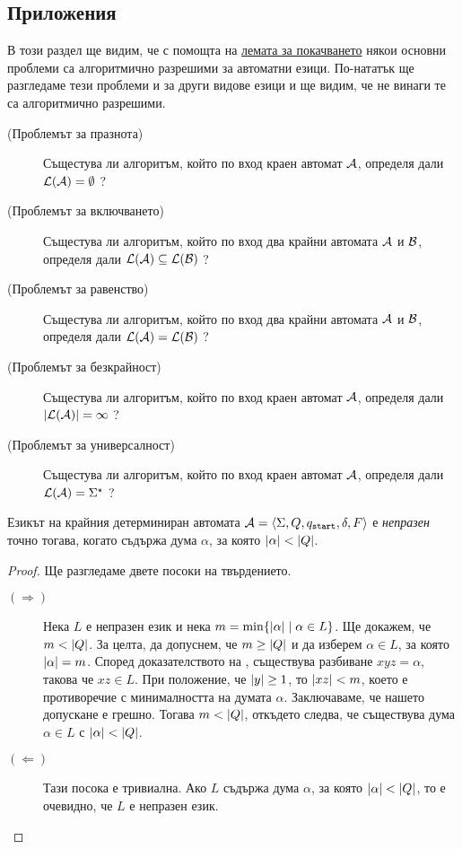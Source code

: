 \subsection*{Приложения}

В този раздел ще видим, че с помощта на \hyperref[lem:regular:pumping]{лемата за покачването} някои основни проблеми са алгоритмично разрешими за автоматни езици. По-нататък ще разгледаме тези проблеми и за други видове езици и ще видим, че не винаги те са алгоритмично разрешими.

\begin{important}
\begin{description}
\item[(Проблемът за празнота)]
  Същестува ли алгоритъм, който по вход краен автомат $\mathcal{A}$,
  определя дали $\mathcal{L}(\mathcal{A}) = \emptyset$ ?
\item[(Проблемът за включването)]
  Същестува ли алгоритъм, който по вход два крайни автомата $\mathcal{A}$ и $\mathcal{B}$,
  определя дали $\mathcal{L}(\mathcal{A}) \subseteq \mathcal{L}(\mathcal{B})$ ?
\item[(Проблемът за равенство)]
  Същестува ли алгоритъм, който по вход два крайни автомата $\mathcal{A}$ и $\mathcal{B}$,
  определя дали $\mathcal{L}(\mathcal{A}) = \mathcal{L}(\mathcal{B})$ ?
\item[(Проблемът за безкрайност)]
  Същестува ли алгоритъм, който по вход краен автомат $\mathcal{A}$,
  определя дали $|\mathcal{L}(\mathcal{A})| = \infty$ ?
\item[(Проблемът за универсалност)]
  Същестува ли алгоритъм, който по вход краен автомат $\mathcal{A}$,
  определя дали $\mathcal{L}(\mathcal{A}) = \Sigma^\star$ ?
\end{description}
\end{important}

\begin{proposition}
  \label{pr:regular:pumping-applications:emptiness}
  Езикът на крайния детерминиран автомата $\mathcal{A} = \langle{\Sigma,Q,q_{\texttt{start}},\delta,F}\rangle$ е {\em непразен} точно тогава, когато съдържа дума $\alpha$,
  за която $\vert{\alpha}\vert < \vert{Q}\vert$.
\end{proposition}
\begin{proof}
  Ще разгледаме двете посоки на твърдението.
  \begin{description}
  \item[$(\Rightarrow)$]
    Нека $L$ е непразен език и нека $m = \min\{\vert{\alpha}\vert \mid \alpha \in L\}$.
    Ще докажем, че $m < \vert{Q}\vert$.    
    За целта, да допуснем, че $m \geq \vert{Q}\vert$ и да изберем $\alpha \in L$, за която $\vert{\alpha}\vert = m$.
    Според доказателството на , съществува разбиване $xyz = \alpha$, 
    такова че $xz \in L$.
    При положение, че $\vert{y}\vert \geq 1$, то $\vert{xz}\vert < m$, което 
    е противоречие с минималността на думата $\alpha$.
    Заключаваме, че нашето допускане е грешно. Тогава $m < \vert{Q}\vert$, откъдето следва, че 
    съществува дума $\alpha \in L$ с $\vert{\alpha}\vert < \vert{Q}\vert$.
  \item[$(\Leftarrow)$]
    Тази посока е тривиална.
    Ако $L$ съдържа дума $\alpha$, за която $\vert{\alpha}\vert < \vert{Q}\vert$,
    то е очевидно, че $L$ е непразен език.
  \end{description}
\end{proof}


